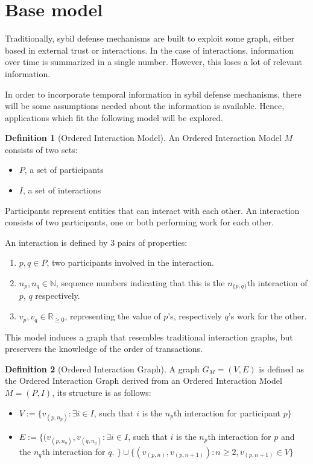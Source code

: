 \documentclass[a4paper,11pt]{book}
\newcommand{\bb}{\mathbb}
\theoremstyle{definition}
\newtheorem{definition}{Definition}
\begin{document}
\section{Base model}

Traditionally, sybil defense mechanisms are built to exploit some graph,
either based in external trust or interactions. In the case of interactions,
information over time is summarized in a single number. However, this loses
a lot of relevant information.

In order to incorporate temporal information in sybil defense mechanisms,
there will be some assumptions needed about the information is available.
Hence, applications which fit the following model will be explored.

\begin{definition}[Ordered Interaction Model]
    An Ordered Interaction Model $M$ consists of two sets:  
    
    \begin{itemize}
        \item $P$, a set of participants
        \item $I$, a set of interactions
    \end{itemize}

    Participants represent entities that can interact with each other.
    An interaction consists of two participants, one or both performing
    work for each other. 
    
    An interaction is defined by 3 pairs of properties:
    \begin{enumerate}
        \item $p, q \in P$, two participants involved in the interaction.
        \item $n_p, n_q \in \bb{N}$, sequence numbers indicating that this is the $n_{\{p,q\}}$th
            interaction of $p$, $q$ respectively.
        \item $v_p, v_q \in \bb{R}_{\geq0}$, representing the value of $p$'s, respectively $q$'s work for the other.
    \end{enumerate}
\end{definition}

  
This model induces a graph that resembles traditional interaction graphs, but preservers the knowledge
of the order of transactions.

\begin{definition}[Ordered Interaction Graph]
    A graph $G_M = (V, E)$ is defined as the Ordered Interaction Graph derived from an Ordered Interaction Model $M = (P,I)$,
    its structure is as follows:

    \begin{itemize}
        \item $V := \{ v_{(p, n_p)} : \exists i \in I$, such that $i$ is the $n_p$th interaction for participant $p\}$\\
        \item $E := \{ (v_{(p, n_q)}, v_{(q, n_q)} : \exists i \in I$, such that $i$ is the $n_p$th interaction
        for $p$ and the $n_q$th interaction for $q$. $\} \cup \{ (v_{(p, n)}, v_{(p, n+1)}) : n \geq 2, v_{(p, n+1)} \in V\}$
    \end{itemize}
\end{definition}
    
\end{document}

